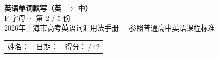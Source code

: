 \documentclass[10pt,a4paper]{article}
\begin{document}
\pagestyle{plain}

\begin{center}
{\LARGE\bfseries 英语单词默写（英 $\to$ 中）}\\[0.22em]
{\large F 字母 · 第 2 / 5 份}\\[0.18em]
{\small 2026年上海市高考英语词汇用法手册 · 参照普通高中英语课程标准}
\end{center}

\vspace{0.25em}
\noindent\begin{tabular}{@{}p{}@{}p{}@{}p{}@{}}
姓名：\underline{\hspace{2.0cm}} & 日期：\underline{\hspace{2.0cm}} & 得分：\underline{\hspace{1.3cm}}\,/\,42 \\
\end{tabular}

\vspace{0.3em}

\vspace{0.08em}
\end{document}
